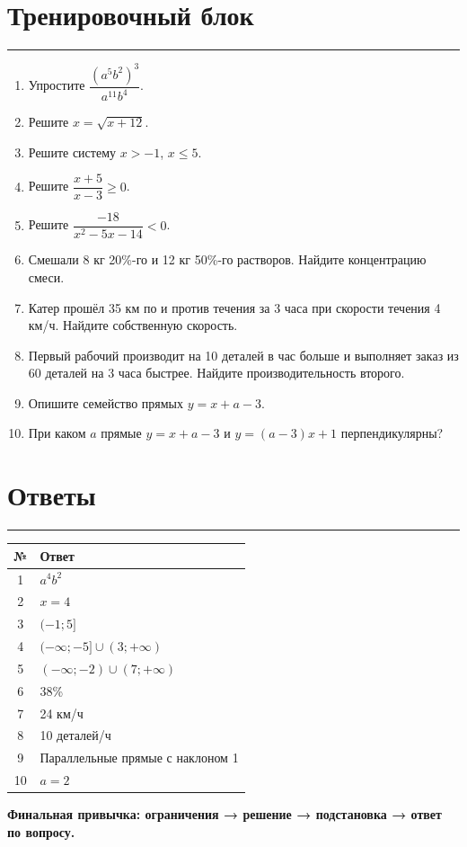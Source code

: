 \documentclass[a4paper,12pt]{article}
\newcommand{\sectionline}{\par\noindent\textcolor{accent}{\rule{\linewidth}{0.6pt}}\par}
\begin{document}
\section*{Тренировочный блок}\sectionline
\begin{enumerate}[leftmargin=2em,itemsep=.8em]
\item Упростите \(\dfrac{(a^5b^2)^3}{a^{11}b^4}\).
\item Решите \(x=\sqrt{x+12}\).
\item Решите систему \(x>-1\), \(x\le5\).
\item Решите \(\dfrac{x+5}{x-3}\ge0\).
\item Решите \(\dfrac{-18}{x^2-5x-14}<0\).
\item Смешали 8 кг 20\%-го и 12 кг 50\%-го растворов. Найдите концентрацию смеси.
\item Катер прошёл 35 км по и против течения за 3 часа при скорости течения 4 км/ч. Найдите собственную скорость.
\item Первый рабочий производит на 10 деталей в час больше и выполняет заказ из 60 деталей на 3 часа быстрее. Найдите производительность второго.
\item Опишите семейство прямых \(y=x+a-3\).
\item При каком \(a\) прямые \(y=x+a-3\) и \(y=(a-3)x+1\) перпендикулярны?
\end{enumerate}
\clearpage
\section*{Ответы}\sectionline
\renewcommand{\arraystretch}{1.35}\begin{tabularx}{\linewidth}{cX}\toprule №&Ответ\\\midrule1&\(a^4b^2\)\\2&\(x=4\)\\3&\((-1;5]\)\\4&\((-\infty;-5]\cup(3;+\infty)\)\\5&\((-\infty;-2)\cup(7;+\infty)\)\\6&38\%\\7&24 км/ч\\8&10 деталей/ч\\9&Параллельные прямые с наклоном 1\\10&\(a=2\)\\\bottomrule\end{tabularx}
\vfill\begin{center}\textcolor{accent}{\textbf{Финальная привычка: ограничения → решение → подстановка → ответ по вопросу.}}\end{center}
\end{document}
